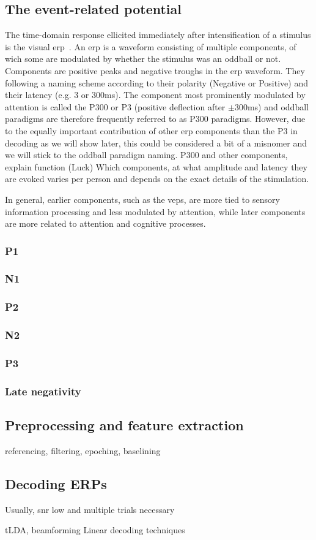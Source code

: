 \subsection{The event-related potential}

The time-domain response ellicited immediately after intensification of a
stimulus is the visual \ac{erp}~\cite{Luck2014}.
An \ac{erp} is a waveform consisting of multiple components, of wich some are
modulated by whether the stimulus was an oddball or not.
Components are positive peaks and negative troughs in the \ac{erp} waveform.
They following a naming scheme according to their polarity (Negative or
Positive) and their latency (e.g. 3 or 300ms).
The component most prominently modulated by attention is called the P300 or P3
(positive deflection after $\pm$300ms) and oddball paradigms are therefore
frequently referred to as P300 paradigms.
However, due to the equally important contribution of other \ac{erp}
components than the P3 in decoding as we will show later, this could be
considered a bit of a misnomer and we will stick to the oddball paradigm naming.
P300 and other components, explain function (Luck)
Which components, at what amplitude and latency they are evoked varies per
person and depends on the exact details of the stimulation.

In general, earlier components, such as the \acp{vep}, are more tied to sensory
information processing and less modulated by attention, while later components
are more related to attention and cognitive processes.

\textcite{Luck2013}
\subsubsection{P1}
\subsubsection{N1}
\subsubsection{P2}
\subsubsection{N2}
\subsubsection{P3}
\subsubsection{Late negativity}

\subsection{Preprocessing and feature extraction}
referencing, filtering, epoching, baselining
\subsection{Decoding ERPs}

Usually, snr low and multiple trials necessary

tLDA, beamforming
Linear decoding techniques
